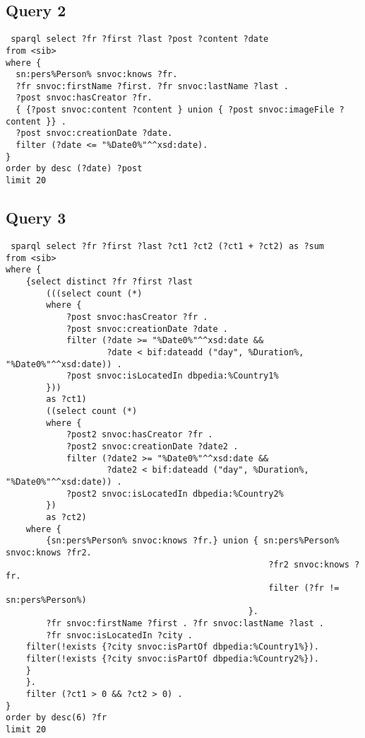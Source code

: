 \subsection{Query 2}

{\footnotesize
\begin{verbatim}
 sparql select ?fr ?first ?last ?post ?content ?date 
from <sib>
where {
  sn:pers%Person% snvoc:knows ?fr.
  ?fr snvoc:firstName ?first. ?fr snvoc:lastName ?last .
  ?post snvoc:hasCreator ?fr.
  { {?post snvoc:content ?content } union { ?post snvoc:imageFile ?content }} .
  ?post snvoc:creationDate ?date.
  filter (?date <= "%Date0%"^^xsd:date).
}
order by desc (?date) ?post
limit 20
\end{verbatim}
}


\subsection{Query 3}

{\footnotesize
\begin{verbatim}
 sparql select ?fr ?first ?last ?ct1 ?ct2 (?ct1 + ?ct2) as ?sum 
from <sib>  
where { 
    {select distinct ?fr ?first ?last
        (((select count (*)
        where {
            ?post snvoc:hasCreator ?fr .
            ?post snvoc:creationDate ?date .
            filter (?date >= "%Date0%"^^xsd:date && 
                    ?date < bif:dateadd ("day", %Duration%, "%Date0%"^^xsd:date)) .
            ?post snvoc:isLocatedIn dbpedia:%Country1%
        }))
        as ?ct1)
        ((select count (*)
        where {
            ?post2 snvoc:hasCreator ?fr .
            ?post2 snvoc:creationDate ?date2 . 
            filter (?date2 >= "%Date0%"^^xsd:date && 
                    ?date2 < bif:dateadd ("day", %Duration%, "%Date0%"^^xsd:date)) .
            ?post2 snvoc:isLocatedIn dbpedia:%Country2%
        })
        as ?ct2)
    where {
        {sn:pers%Person% snvoc:knows ?fr.} union { sn:pers%Person% snvoc:knows ?fr2.
                                                    ?fr2 snvoc:knows ?fr.
                                                    filter (?fr != sn:pers%Person%)
                                                }.
        ?fr snvoc:firstName ?first . ?fr snvoc:lastName ?last .
        ?fr snvoc:isLocatedIn ?city .
    filter(!exists {?city snvoc:isPartOf dbpedia:%Country1%}).
    filter(!exists {?city snvoc:isPartOf dbpedia:%Country2%}).
    }
    }.
    filter (?ct1 > 0 && ?ct2 > 0) .
}
order by desc(6) ?fr
limit 20
\end{verbatim}
}

